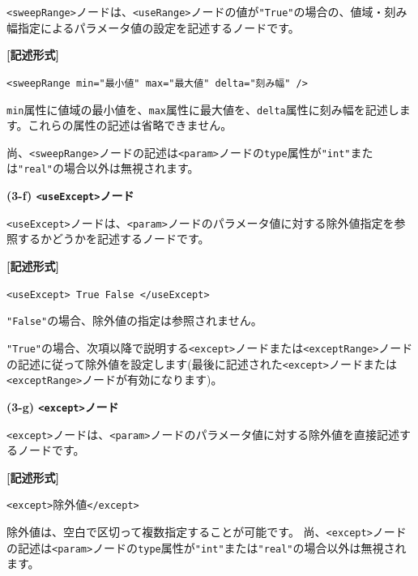 \documentclass[a4paper,11pt]{jarticle}
\begin{document}
{\texttt{<sweepRange>}ノードは、\texttt{<useRange>}ノードの値が\texttt{"True"}の場合の、値域・刻み幅指定によるパラメータ値の設定を記述するノードです。

\vspace{8pt}
\leftskip=12pt
\textbf{[記述形式]}

\leftskip=42pt
\texttt{<sweepRange  min="最小値"  max="最大値"  delta="刻み幅" />}

\vspace{8pt}
\leftskip=0pt
{\tt min}属性に値域の最小値を、{\tt max}属性に最大値を、{\tt delta}属性に刻み幅を記述します。これらの属性の記述は省略できません。

尚、\texttt{<sweepRange>}ノードの記述は\texttt{<param>}ノードの{\tt type}属性が\texttt{"int"}または\texttt{"real"}の場合以外は無視されます。

\vspace{12pt}
\textbf{(3-f) \texttt{<useExcept>}ノード}

\texttt{<useExcept>}ノードは、\texttt{<param>}ノードのパラメータ値に対する除外値指定を参照するかどうかを記述するノードです。

\vspace{8pt}
\leftskip=12pt
\textbf{[記述形式]}

\leftskip=42pt
\texttt{<useExcept> True \textbar{} False </useExcept>}

\vspace{8pt}
\leftskip=0pt
\texttt{"False"}の場合、除外値の指定は参照されません。

\texttt{"True"}の場合、次項以降で説明する\texttt{<except>}ノードまたは\texttt{<exceptRange>}ノードの記述に従って除外値を設定します(最後に記述された\texttt{<except>}ノードまたは\texttt{<exceptRange>}ノードが有効になります)。

\vspace{12pt}
\textbf{(3-g) \texttt{<except>}ノード}

\texttt{<except>}ノードは、\texttt{<param>}ノードのパラメータ値に対する除外値を直接記述するノードです。

\vspace{8pt}
\leftskip=12pt
\textbf{[記述形式]}

\leftskip=42pt
\texttt{<except>}除外値\texttt{</except>}

\vspace{8pt}
\leftskip=0pt
除外値は、空白で区切って複数指定することが可能です。
尚、\texttt{<except>}ノードの記述は\texttt{<param>}ノードの{\tt type}属性が\texttt{"int"}または\texttt{"real"}の場合以外は無視されます。

}
\end{document}
